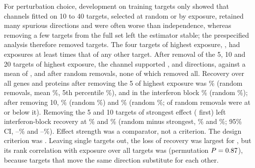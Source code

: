 For perturbation choice, development on training targets only
showed that channels fitted on 10 to 40 targets, selected at
random or by exposure, retained many spurious directions and were often worse
than independence, whereas removing a few targets from the full set left the
estimator stable; the prespecified analysis therefore removed targets. The four
targets of highest exposure, \DsTopFour, had exposures at least \DsExposureGap{}
times that of any other target. After removal of the 5, 10 and 20 targets of
highest exposure, the channel supported \DsFiveDimExp, \DsTenDimExp{} and
\DsTwentyDimExp{} directions, against a mean of \DsFiveDimRand, \DsTenDimRand{} and
\DsTwentyDimRand{} after random removals, none of which removed all. Recovery over
all genes and proteins after removing the 5 of highest exposure was \DsFiveAllExp\%
(random removals, mean \DsFiveAllRand\%, 5th percentile \DsFiveAllRandLow\%), and
in the interferon block \DsFiveIfnExp\% (random \DsFiveIfnRand\%); after removing
10, \DsTenAllExp\% (random \DsTenAllRand\%) and \DsTenIfnExp\% (random
\DsTenIfnRand\%; \DsTenIfnBelow{} of \DsDraws{} random removals were at or below
it). Removing the 5 and 10 targets of strongest effect (\DsTopStrengthFive{} first)
left interferon-block recovery at \DsFiveIfnStr\% and \DsTenIfnStr\%
(random minus strongest, \DsFiveIfnDiffStr\% and \DsTenIfnDiffStr\%; 95\% CI,
\DsFiveIfnDiffStrLo--\DsFiveIfnDiffStrHi\% and \DsTenIfnDiffStrLo--\DsTenIfnDiffStrHi\%).
Effect strength was a comparator, not a criterion. The design criterion was \DsDOne. Leaving single targets out, the loss of
recovery was largest for \DsLooTop, but its rank correlation with exposure over all
targets was \DsLooSpearman{} (permutation $P=0.87$), because targets that move
the same direction substitute for each other.

\begin{table}[h]
\caption{\textbf{Recovery by program (\%).} Held-out target-by-condition groups of
the melanoma screen and non-targeting cells. Blocks: interferon genes and
antibodies; the RNA score along the supported direction with all antibodies;
interferon genes with all antibodies; all other genes and antibodies; genes of
other Hallmark programs with all antibodies. Arms: no pairs, the primary pairing-free
channel; paired CF, paired closed form; ref.\ regr., reference regression; transf.\
corr., pooled within-condition correlation of paired training cells; own pairs, ridge
regression on the group's paired adaptation cells; replicate, the adaptation half
used directly as the estimate. Rel., split-half reliability of the scoring target
(pooled over groups).}
\label{tab:programs}
\centering\scriptsize\setlength{\tabcolsep}{3pt}

\end{table}

